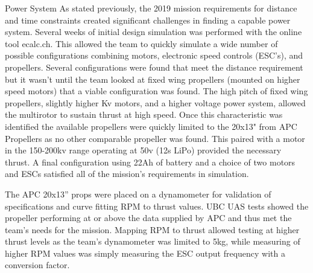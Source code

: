 \begin{subsubsection}{Power System}
As stated previously, the 2019 mission requirements for distance and time constraints created significant challenges in finding a capable power system. Several weeks of initial design simulation was performed with the online tool ecalc.ch. This allowed the team to quickly simulate a wide number of possible configurations combining motors, electronic speed controls (ESC's), and propellers. Several configurations were found that meet the distance requirement but it wasn’t until the team looked at fixed wing propellers (mounted on higher speed motors) that a viable configuration was found. The high pitch of fixed wing propellers, slightly higher Kv motors, and a higher voltage power system, allowed the multirotor to sustain thrust at high speed. Once this characteristic was identified the available propellers were quickly limited to the 20x13" from APC Propellers as no other comparable propeller was found. This paired with a motor in the 150-200kv range operating at 50v (12s LiPo) provided the necessary thrust. A final configuration using 22Ah of battery and a choice of two motors and ESCs satisfied all of the mission’s requirements in simulation. 

The APC 20x13” props were placed on a dynamometer for validation of specifications and curve fitting RPM to thrust values. UBC UAS tests showed the propeller performing at or above the data supplied by APC and thus met the team’s needs for the mission. Mapping RPM to thrust allowed testing at higher thrust levels as the team’s dynamometer was limited to 5kg, while measuring of higher RPM values was simply measuring the ESC output frequency with a conversion factor. 

\vspace{5mm}


\end{subsubsection}
